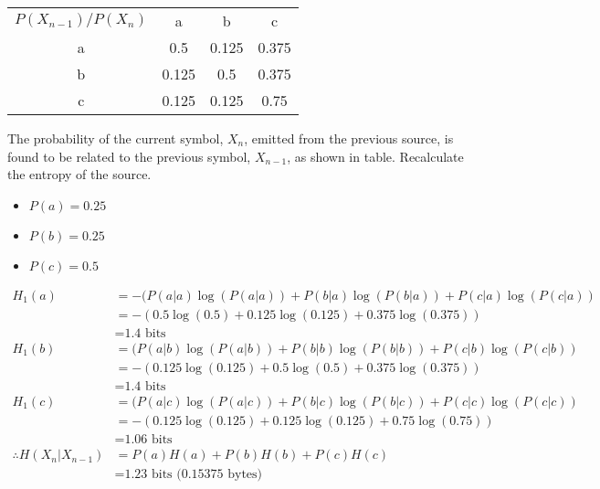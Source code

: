 \begin{question}
\begin{table}[h]
\renewcommand{\arraystretch}{1.3}
\centering
\begin{tabular}{c|c|c|c}
\hline
 $P(X_{n-1}) /P(X_{n}) $ & a  & b  & c \\
a & 0.5 & 0.125 & 0.375 \\
b & 0.125 & 0.5 & 0.375\\
c & 0.125 & 0.125 & 0.75 \\
\hline
\end{tabular}
\end{table}

The probability of the current symbol, $X_n$, emitted from the previous source, is found to be related to the previous symbol, $X_{n-1}$, as shown in table. Recalculate the entropy of the source.

\end{question}
\begin{solution}
\begin{itemize}
\item $P(a) = 0.25$
\item $P(b) = 0.25$
\item $P(c) = 0.5$
\end{itemize}


\begin{equation}
\begin{aligned}
H_1(a) &= -( P(a|a)\log(P(a|a)) + P(b|a)\log(P(b|a)) + P(c|a)\log(P(c|a))\\
&= - (  0.5\log(0.5) + 0.125\log(0.125) + 0.375\log(0.375)) \\
&= \text{1.4 bits}  \\
H_1(b) &= ( P(a|b)\log(P(a|b)) + P(b|b)\log(P(b|b)) + P(c|b)\log(P(c|b))\\
&= - (  0.125\log(0.125) + 0.5\log(0.5) + 0.375\log(0.375)) \\
&= \text{1.4 bits} \\
H_1(c) &= ( P(a|c)\log(P(a|c)) + P(b|c)\log(P(b|c)) + P(c|c)\log(P(c|c))\\
&= - (  0.125\log(0.125) + 0.125\log(0.125) + 0.75\log(0.75)) \\
&= \text{1.06 bits} \\
\therefore H(X_n|X_{n-1}) &= P(a)H(a) + P(b)H(b) + P(c)H(c) \\
&= \text{1.23 bits (0.15375 bytes)}
\end{aligned}
\end{equation}

\end{solution}


